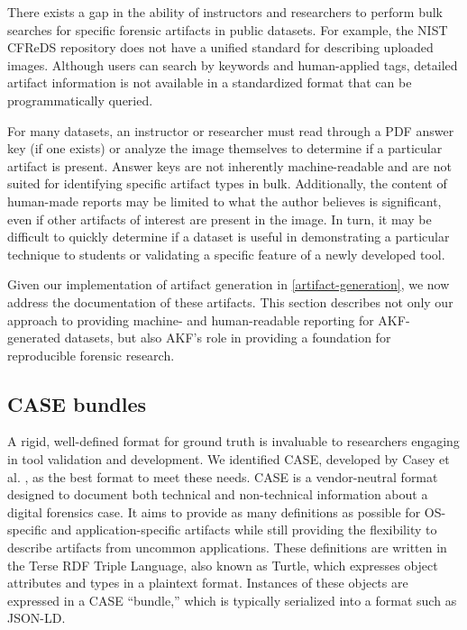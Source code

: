 \documentclass[final,5p,times,twocolumn]{elsarticle}
\begin{document}
There exists a gap in the ability of instructors and researchers to
perform bulk searches for specific forensic artifacts in public
datasets. For example, the NIST CFReDS repository does not have a
unified standard for describing uploaded images. Although users can
search by keywords and human-applied tags, detailed artifact information
is not available in a standardized format that can be programmatically
queried.

For many datasets, an instructor or researcher must read through a PDF
answer key (if one exists) or analyze the image themselves to determine
if a particular artifact is present. Answer keys are not inherently
machine-readable and are not suited for identifying specific artifact
types in bulk. Additionally, the content of human-made reports may be
limited to what the author believes is significant, even if other
artifacts of interest are present in the image. In turn, it may be
difficult to quickly determine if a dataset is useful in demonstrating a
particular technique to students or validating a specific feature of a
newly developed tool.

Given our implementation of artifact generation in \autoref{artifact-generation}, we now address the documentation of these artifacts. This
section describes not only our approach to providing machine- and
human-readable reporting for AKF-generated datasets, but also AKF's role
in providing a foundation for reproducible forensic research.

\subsection{CASE bundles}\label{case-bundles}

A rigid, well-defined format for ground truth is invaluable to
researchers engaging in tool validation and development. We identified
CASE, developed by Casey et al.
\citep{caseyAdvancingCoordinatedCyberinvestigations2017}, as the best
format to meet these needs. CASE is a vendor-neutral format designed to
document both technical and non-technical information about a digital
forensics case. It aims to provide as many definitions as possible for
OS-specific and application-specific artifacts while still providing the
flexibility to describe artifacts from uncommon applications. These
definitions are written in the Terse RDF Triple Language, also known as
Turtle, which expresses object attributes and types in a plaintext
format. Instances of these objects are expressed in a CASE ``bundle,''
which is typically serialized into a format such as JSON-LD.
\end{document}
